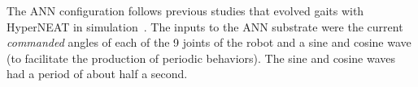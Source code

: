 %  
  
The ANN configuration follows previous studies that evolved 
gaits with HyperNEAT in simulation~\cite{clune2009evolving}.
The inputs to the ANN
substrate were the current \emph{commanded} angles of each of the 9 joints of the robot and a sine and cosine wave (to facilitate the
production of periodic behaviors). The sine and cosine waves had a period of about half a second.


